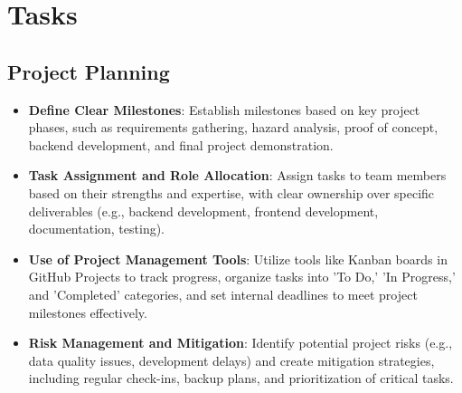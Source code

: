 \documentclass[12pt]{article}
\begin{document}
\section{Tasks}

\subsection{Project Planning}
\begin{itemize} 
    \item \textbf{Define Clear Milestones}: Establish milestones based on key project phases, such as requirements gathering, hazard analysis, proof of concept, backend development, and final project demonstration.
    \item \textbf{Task Assignment and Role Allocation}: Assign tasks to team members based on their strengths and expertise, with clear ownership over specific deliverables (e.g., backend development, frontend development, documentation, testing).
    \item \textbf{Use of Project Management Tools}: Utilize tools like Kanban boards in GitHub Projects to track progress, organize tasks into 'To Do,' 'In Progress,' and 'Completed' categories, and set internal deadlines to meet project milestones effectively.
    \item \textbf{Risk Management and Mitigation}: Identify potential project risks (e.g., data quality issues, development delays) and create mitigation strategies, including regular check-ins, backup plans, and prioritization of critical tasks.
\end{itemize}
\end{document}
